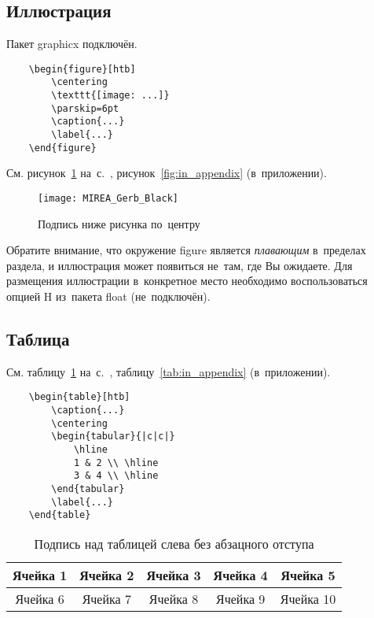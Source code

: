\documentclass{mirea-prog-lang}
\begin{document}
\subsection{Иллюстрация}

Пакет graphicx подключён.

\begin{verbatim}
	\begin{figure}[htb]
		\centering
		\texttt{[image: ...]}
		\parskip=6pt
		\caption{...}
		\label{...}
	\end{figure}
\end{verbatim}

См. рисунок~\ref{fig:test_label} на~с.~\pageref{fig:test_label}, рисунок~\ref{fig:in_appendix} (в~приложении).

\begin{figure}[htb]
	\centering
	\texttt{[image: MIREA\_Gerb\_Black]}
	\parskip=6pt
	\caption{Подпись ниже рисунка по~центру}
	\label{fig:test_label}
\end{figure}

Обратите внимание, что окружение figure является \emph{плавающим} в~пределах раздела, и иллюстрация может появиться не~там, где Вы ожидаете. Для размещения иллюстрации в~конкретное место необходимо воспользоваться опцией H из~пакета float (не~подключён).

\subsection{Таблица}

См. таблицу~\ref{tab:test_label} на~с.~\pageref{tab:test_label}, таблицу~\ref{tab:in_appendix} (в~приложении).

\begin{verbatim}
	\begin{table}[htb]
		\caption{...}
		\centering
		\begin{tabular}{|c|c|} 
			\hline
			1 & 2 \\ \hline
			3 & 4 \\ \hline
		\end{tabular}
		\label{...}
	\end{table}
\end{verbatim}

\begin{table}[htb]
	\caption{Подпись над таблицей слева без абзацного отступа}
	\centering
	\begin{tabular}{ |c|c|c|c|c| } 
		\hline
		Ячейка 1 & Ячейка 2 & Ячейка 3 & Ячейка 4 & Ячейка 5 \\ \hline
		Ячейка 6 & Ячейка 7 & Ячейка 8 & Ячейка 9 & Ячейка 10 \\ \hline
	\end{tabular}
	\label{tab:test_label}
\end{table}
\end{document}
